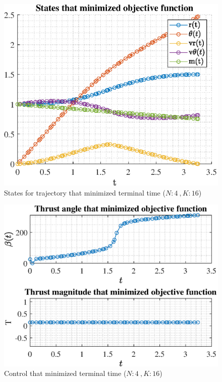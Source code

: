 \documentclass[]{article}
\begin{document}
\begin{figure}
	\centering
	\includegraphics[scale=0.75]{states_N4_K16_C2_tf.eps}
	\caption{States for trajectory that minimized terminal time (\(N:4\ , K:16\))}
	\label{fig:states_N4_K16_C2_tf}
\end{figure}
\begin{figure}
	\centering
	\includegraphics[scale=0.75]{control_N4_K16_C2_tf.eps}
	\caption{Control that minimized terminal time (\(N:4\ , K:16\))}
	\label{fig:control_N4_K16_C2_tf}
\end{figure}
\end{document}
